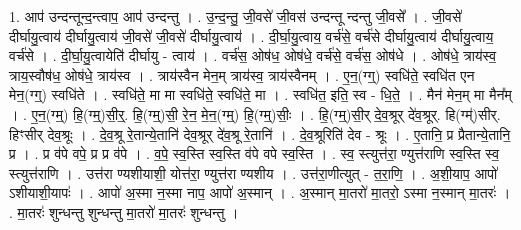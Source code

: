 \documentclass[17pt]{extarticle}
\begin{document}
1. आप॑ उन्दन्तून्द॒न्त्वाप॒ आप॑ उन्दन्तु । . उ॒न्द॒न्तु॒ जी॒वसे॑ जी॒वस॑ उन्दन्तू न्दन्तु जी॒वसे᳚ । . जी॒वसे॑ दीर्घायु॒त्वाय॑ दीर्घायु॒त्वाय॑ जी॒वसे॑ जी॒वसे॑ दीर्घायु॒त्वाय॑ । . दी॒र्घा॒यु॒त्वाय॒ वर्च॑से॒ वर्च॑से दीर्घायु॒त्वाय॑ दीर्घायु॒त्वाय॒ वर्च॑से । . दी॒र्घा॒यु॒त्वायेति॑ दीर्घायु - त्वाय॑ । . वर्च॑स॒ ओष॑ध॒ ओष॑धे॒ वर्च॑से॒ वर्च॑स॒ ओष॑धे । . ओष॑धे॒ त्राय॑स्व॒ त्राय॒स्वौष॑ध॒ ओष॑धे॒ त्राय॑स्व । . त्राय॑स्वैन मेन॒म् त्राय॑स्व॒ त्राय॑स्वैनम् । . ए॒न॒(ग्ग्॒) स्वधि॑ते॒ स्वधि॑त एन मेन॒(ग्ग्॒) स्वधि॑ते । . स्वधि॑ते॒ मा मा स्वधि॑ते॒ स्वधि॑ते॒ मा । . स्वधि॑त॒ इति॒ स्व - धि॒ते॒ । . मैन॑ मेन॒म् मा मैन᳚म् । . ए॒न॒(ग्म्॒) हि॒(ग्म्॒)सी॒र्॒. हि॒(ग्म्॒)सी॒ रे॒न॒ मे॒न॒(ग्म्॒) हि॒(ग्म्॒)सीः॒ । . हि॒(ग्म्॒)सी॒र् दे॒व॒श्रूर् दे॑व॒श्रूर्. हि(ग्म्॑)सीर्. हिꣳसीर् देव॒श्रूः । . दे॒व॒श्रू रे॒तान्ये॒तानि॑ देव॒श्रूर् दे॑व॒श्रू रे॒तानि॑ । . दे॒व॒श्रूरिति॑ देव - श्रूः । . ए॒तानि॒ प्र प्रैतान्ये॒तानि॒ प्र । . प्र व॑पे वपे॒ प्र प्र व॑पे । . व॒पे॒ स्व॒स्ति स्व॒स्ति व॑पे वपे स्व॒स्ति । . स्व॒ स्त्युत्त॑रा॒ ण्युत्त॑राणि स्व॒स्ति स्व॒ स्त्युत्त॑राणि । . उत्त॑रा ण्यशीयाशी॒ योत्त॑रा॒ ण्युत्त॑रा ण्यशीय । . उत्त॑रा॒णीत्युत् - त॒रा॒णि॒ । . अ॒शी॒याप॒ आपो॑ ऽशीयाशी॒यापः॑ । . आपो॑ अ॒स्मा न॒स्मा नाप॒ आपो॑ अ॒स्मान् । . अ॒स्मान् मा॒तरो॑ मा॒तरो॒ ऽस्मा न॒स्मान् मा॒तरः॑ । . मा॒तरः॑ शुन्धन्तु शुन्धन्तु मा॒तरो॑ मा॒तरः॑ शुन्धन्तु । \newline
\end{document}
